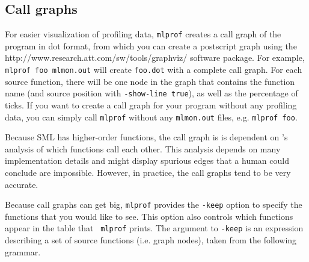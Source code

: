 \subsection{Call graphs}

For easier visualization of profiling data, {\tt mlprof} creates a
call graph of the program in dot format, from which you can create a
postscript graph using the
		  {http://www.research.att.com/sw/tools/graphviz/}
software package.  For example, {\tt mlprof foo mlmon.out} will create
{\tt foo.dot} with a complete call graph.  For each source function,
there will be one node in the graph that contains the function name
(and source position with {\tt -show-line true}), as well as the
percentage of ticks.  If you want to create a call graph for your
program without any profiling data, you can simply call {\tt mlprof}
without any {\tt mlmon.out} files, e.g. {\tt mlprof foo}.

Because SML has higher-order functions, the call graph is is dependent
on {\mlton}'s analysis of which functions call each other.  This
analysis depends on many implementation details and might display
spurious edges that a human could conclude are impossible.  However,
in practice, the call graphs tend to be very accurate.

Because call graphs can get big, {\tt mlprof} provides the {\tt -keep}
option to specify the functions that you would like to see.  This
option also controls which functions appear in the table that {\tt
mlprof} prints.  The argument to {\tt -keep} is an expression
describing a set of source functions (i.e. graph nodes), taken from
the following grammar.

